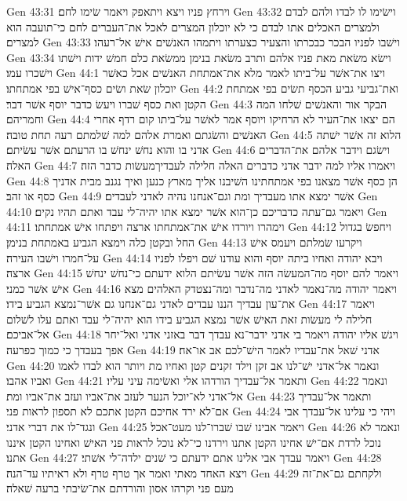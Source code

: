 Gen 43:31  וירחץ פניו ויצא ויתאפק ויאמר שׂימו לחם׃
Gen 43:32  וישׂימו לו לבדו ולהם לבדם ולמצרים האכלים אתו לבדם כי לא יוכלון המצרים לאכל את־העברים לחם כי־תועבה הוא למצרים׃
Gen 43:33  וישׁבו לפניו הבכר כבכרתו והצעיר כצערתו ויתמהו האנשׁים אישׁ אל־רעהו׃
Gen 43:34  וישׂא משׂאת מאת פניו אלהם ותרב משׂאת בנימן ממשׂאת כלם חמשׁ ידות וישׁתו וישׁכרו עמו׃
Gen 44:1  ויצו את־אשׁר על־ביתו לאמר מלא את־אמתחת האנשׁים אכל כאשׁר יוכלון שׂאת ושׂים כסף־אישׁ בפי אמתחתו׃
Gen 44:2  ואת־גביעי גביע הכסף תשׂים בפי אמתחת הקטן ואת כסף שׁברו ויעשׂ כדבר יוסף אשׁר דבר׃
Gen 44:3  הבקר אור והאנשׁים שׁלחו המה וחמריהם׃
Gen 44:4  הם יצאו את־העיר לא הרחיקו ויוסף אמר לאשׁר על־ביתו קום רדף אחרי האנשׁים והשׂגתם ואמרת אלהם למה שׁלמתם רעה תחת טובה׃
Gen 44:5  הלוא זה אשׁר ישׁתה אדני בו והוא נחשׁ ינחשׁ בו הרעתם אשׁר עשׂיתם׃
Gen 44:6  וישׂגם וידבר אלהם את־הדברים האלה׃
Gen 44:7  ויאמרו אליו למה ידבר אדני כדברים האלה חלילה לעבדיךמעשׂות כדבר הזה׃
Gen 44:8  הן כסף אשׁר מצאנו בפי אמתחתינו השׁיבנו אליך מארץ כנען ואיך נגנב מבית אדניך כסף או זהב׃
Gen 44:9  אשׁר ימצא אתו מעבדיך ומת וגם־אנחנו נהיה לאדני לעבדים׃
Gen 44:10  ויאמר גם־עתה כדבריכם כן־הוא אשׁר ימצא אתו יהיה־לי עבד ואתם תהיו נקים׃
Gen 44:11  וימהרו ויורדו אישׁ את־אמתחתו ארצה ויפתחו אישׁ אמתחתו׃
Gen 44:12  ויחפשׂ בגדול החל ובקטן כלה וימצא הגביע באמתחת בנימן׃
Gen 44:13  ויקרעו שׂמלתם ויעמס אישׁ על־חמרו וישׁבו העירה׃
Gen 44:14  ויבא יהודה ואחיו ביתה יוסף והוא עודנו שׁם ויפלו לפניו ארצה׃
Gen 44:15  ויאמר להם יוסף מה־המעשׂה הזה אשׁר עשׂיתם הלוא ידעתם כי־נחשׁ ינחשׁ אישׁ אשׁר כמני׃
Gen 44:16  ויאמר יהודה מה־נאמר לאדני מה־נדבר ומה־נצטדק האלהים מצא את־עון עבדיך הננו עבדים לאדני גם־אנחנו גם אשׁר־נמצא הגביע בידו׃
Gen 44:17  ויאמר חלילה לי מעשׂות זאת האישׁ אשׁר נמצא הגביע בידו הוא יהיה־לי עבד ואתם עלו לשׁלום אל־אביכם׃
Gen 44:18  ויגשׁ אליו יהודה ויאמר בי אדני ידבר־נא עבדך דבר באזני אדני ואל־יחר אפך בעבדך כי כמוך כפרעה׃
Gen 44:19  אדני שׁאל את־עבדיו לאמר הישׁ־לכם אב או־אח׃
Gen 44:20  ונאמר אל־אדני ישׁ־לנו אב זקן וילד זקנים קטן ואחיו מת ויותר הוא לבדו לאמו ואביו אהבו׃
Gen 44:21  ותאמר אל־עבדיך הורדהו אלי ואשׂימה עיני עליו׃
Gen 44:22  ונאמר אל־אדני לא־יוכל הנער לעזב את־אביו ועזב את־אביו ומת׃
Gen 44:23  ותאמר אל־עבדיך אם־לא ירד אחיכם הקטן אתכם לא תספון לראות פני׃
Gen 44:24  ויהי כי עלינו אל־עבדך אבי ונגד־לו את דברי אדני׃
Gen 44:25  ויאמר אבינו שׁבו שׁברו־לנו מעט־אכל׃
Gen 44:26  ונאמר לא נוכל לרדת אם־ישׁ אחינו הקטן אתנו וירדנו כי־לא נוכל לראות פני האישׁ ואחינו הקטן איננו אתנו׃
Gen 44:27  ויאמר עבדך אבי אלינו אתם ידעתם כי שׁנים ילדה־לי אשׁתי׃
Gen 44:28  ויצא האחד מאתי ואמר אך טרף טרף ולא ראיתיו עד־הנה׃
Gen 44:29  ולקחתם גם־את־זה מעם פני וקרהו אסון והורדתם את־שׂיבתי ברעה שׁאלה׃
